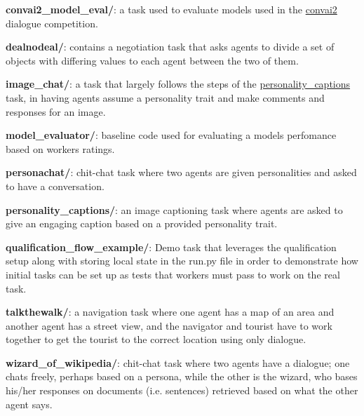 \begin{DoxyItemize}
\item {\bfseries convai2\+\_\+model\+\_\+eval/}\+: a task used to evaluate models used in the \hyperlink{namespaceconvai2}{convai2} dialogue competition.
\item {\bfseries dealnodeal/}\+: contains a negotiation task that asks agents to divide a set of objects with differing values to each agent between the two of them.
\item {\bfseries image\+\_\+chat/}\+: a task that largely follows the steps of the {\ttfamily \hyperlink{namespacepersonality__captions}{personality\+\_\+captions}} task, in having agents assume a personality trait and make comments and responses for an image.
\item {\bfseries model\+\_\+evaluator/}\+: baseline code used for evaluating a model\textquotesingle{}s perfomance based on workers\textquotesingle{} ratings.
\item {\bfseries personachat/}\+: chit-\/chat task where two agents are given personalities and asked to have a conversation.
\item {\bfseries personality\+\_\+captions/}\+: an image captioning task where agents are asked to give an engaging caption based on a provided personality trait.
\item {\bfseries qualification\+\_\+flow\+\_\+example/}\+: Demo task that leverages the qualification setup along with storing local state in the {\ttfamily run.\+py} file in order to demonstrate how initial tasks can be set up as \textquotesingle{}tests\textquotesingle{} that workers must pass to work on the real task.
\item {\bfseries talkthewalk/}\+: a navigation task where one agent has a map of an area and another agent has a street view, and the navigator and tourist have to work together to get the tourist to the correct location using only dialogue.
\item {\bfseries wizard\+\_\+of\+\_\+wikipedia/}\+: chit-\/chat task where two agents have a dialogue; one chats freely, perhaps based on a persona, while the other is the \textquotesingle{}wizard\textquotesingle{}, who bases his/her responses on documents (i.\+e. sentences) retrieved based on what the other agent says. 
\end{DoxyItemize}